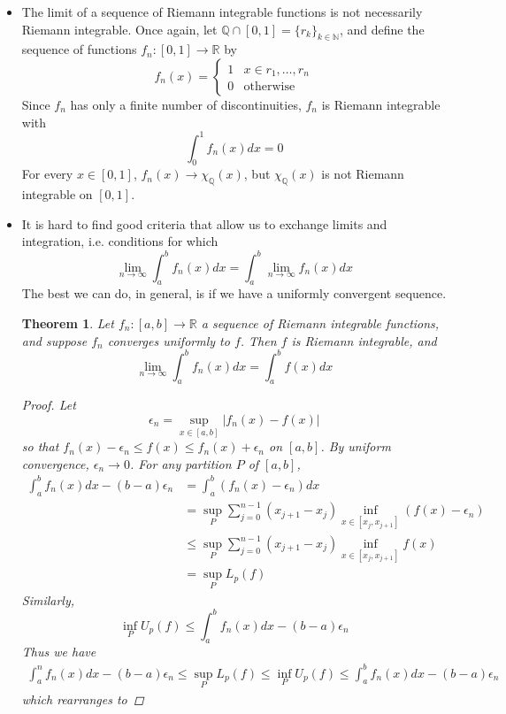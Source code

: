\documentclass[12pt]{amsart}         %
\newtheorem{theorem}{Theorem}[section]
\theoremstyle{remark}
\newcommand{\N}{\mathbb{N}}
\newcommand{\R}{\mathbb{R}}
\newcommand{\Q}{\mathbb{Q}}
\begin{document}
\begin{itemize}
    \item The limit of a sequence of Riemann integrable functions is not necessarily Riemann integrable. Once again, let $\Q \cap [0, 1] = \{ r_k \}_{k \in \N}$, and define the sequence of functions $f_n: [0, 1] \rightarrow \R$ by
    \[
    f_n(x) = \begin{cases}
    1 & x \in {r_1, \dots, r_n} \\
    0 & \text{otherwise}
    \end{cases}
    \]
    Since $f_n$ has only a finite number of discontinuities, $f_n$ is Riemann integrable with
    \[
    \int_0^1 f_n(x) dx = 0
    \]
    For every $x \in [0, 1]$, $f_n(x) \rightarrow \chi_\Q(x)$, but $\chi_\Q(x)$ is not Riemann integrable on $[0, 1]$.
    \item It is hard to find good criteria that allow us to exchange limits and integration, i.e. conditions for which
    \[
    \lim_{n\rightarrow\infty}\int_a^b f_n(x) dx = \int_a^b \lim_{n\rightarrow\infty} f_n(x) dx
    \]
    The best we can do, in general, is if we have a uniformly convergent sequence.
    \begin{theorem}
    Let $f_n: [a, b] \rightarrow \R$ a sequence of Riemann integrable functions, and suppose $f_n$ converges uniformly to $f$. Then $f$ is Riemann integrable, and
     \[
    \lim_{n\rightarrow\infty}\int_a^b f_n(x) dx = \int_a^b f(x) dx
    \]
    \begin{proof}
    Let 
    \[
    \epsilon_n = \sup_{x \in [a, b]}|f_n(x) - f(x)|
    \]
    so that $f_n(x) - \epsilon_n \leq f(x) \leq f_n(x) + \epsilon_n$ on $[a, b]$. By uniform convergence, $\epsilon_n \rightarrow 0$. For any partition $P$ of $[a, b]$,
    \begin{align*}
    \int_a^b f_n(x) dx - (b-a)\epsilon_n &=
    \int_a^b (f_n(x) - \epsilon_n) dx \\
    &= \sup_P \sum_{j = 0}^{n-1} (x_{j+1} - x_j) \inf_{x \in [x_j, x_{j+1}]} (f(x) - \epsilon_n) \\
    &\leq \sup_P \sum_{j = 0}^{n-1} (x_{j+1} - x_j) \inf_{x \in [x_j, x_{j+1}]} f(x) \\
    &= \sup_P L_p(f)
    \end{align*}
    Similarly,
    \[
    \inf_P U_p(f) \leq \int_a^b f_n(x) dx - (b-a)\epsilon_n
    \]
    Thus we have
    \begin{align*}
    \int_a^n f_n(x) dx - (b-a)\epsilon_n \leq \sup_P L_p(f) \leq \inf_P U_p(f) \leq \int_a^b f_n(x) dx - (b-a)\epsilon_n
    \end{align*}
    which rearranges to

\end{proof}
\end{theorem}
\end{itemize}
\end{document}
